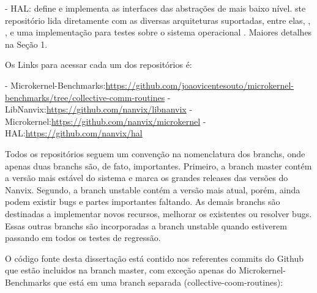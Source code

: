 - HAL: define e implementa as interfaces das abstrações de mais baixo nível.
ste repositório lida diretamente com as diversas arquiteturas suportadas, entre elas,
\mppa, \optimsoc, \hero e uma implementação para testes sobre o sistema operacional \unix.
Maiores detalhes na Seção 1.

Os Links para acessar cada um dos repositórios é:

- Microkernel-Benchmarks:\url{https://github.com/joaovicentesouto/microkernel-benchmarks/tree/collective-comm-routines}
- LibNanvix:\url{https://github.com/nanvix/libnanvix}
- Microkernel:\url{https://github.com/nanvix/microkernel}
- HAL:\url{https://github.com/nanvix/hal}

\label{sec:code-version}

Todos os repositórios seguem um convenção na nomenclatura dos branchs, onde apenas duas branchs
são, de fato, importantes.
Primeiro, a branch master contém a versão mais estável do sistema e marca os grandes releases das versões do Nanvix.
Segundo, a branch unstable contém a versão mais atual, porém, ainda podem existir bugs e partes importantes faltando.
As demais branchs são destinadas a implementar novos recursos, melhorar os existentes ou resolver bugs.
Essas outras branchs são incorporadas a branch unstable quando estiverem passando em todos os testes de regressão.

O código fonte desta dissertação está contido nos referentes commits do Github que estão incluidos na branch master,
com exceção apenas do Microkernel-Benchmarks que está em uma branch separada (collective-coom-routines):

